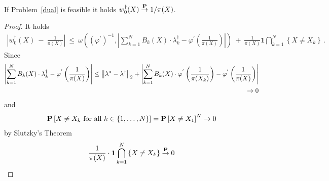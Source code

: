 \begin{theorem}
  If Problem~\ref{dual} is feasible it holds
  $w_0^\dagger(X)\overset{\P}{\to}1/\pi(X)$.
\end{theorem}
\begin{proof}
  It holds
  \begin{align*}
    \left| 
    w_0^\dagger(X)
    \ 
    -
    \ 
    \frac{1}{\pi(X)}
    \right|
    \
    \le
    \
    \omega
    \left( 
      (\varphi^{'})^{-1}
      ,
      \left| 
      \sum_{k=1}^{N} 
      B_k(X)\cdot\lambda_k^\dagger-
      \varphi^{'}
      \left( \frac{1}{\pi(X)} \right)
      \right|
    \right)
    \
    +
    \
    \frac{1}{\pi(X)}
    \mathbf{1}
    \bigcap_{k=1}^N
    \left\{ X\neq X_k \right\}
    \,.
  \end{align*}
  Since
  \begin{align*}
      \left| 
      \sum_{k=1}^{N} 
      B_k(X)\cdot\lambda_k^\dagger-
      \varphi^{'}
      \left( \frac{1}{\pi(X)} \right)
      \right|
      \le
      \norm{\lambda^*-\lambda^\dagger}_2
      +
      \left| 
      \sum_{k=1}^{N} 
      B_k(X)\cdot
      \varphi^{'}
      \left( \frac{1}{\pi(X_k)} \right)
      -
      \varphi^{'}
      \left( \frac{1}{\pi(X)} \right)
      \right|
      \\
      \to 0
  \end{align*}
  and
  \begin{align*}
    \P
    \left[ 
      X\neq X_k \ \text{for all }
      k\in \left\{ 1,\ldots,N \right\}
    \right]
    =
    \P \left[ X\neq X_1 \right]^N
    \to
    0
  \end{align*}
  by Slutzky's Theorem
  \begin{align*}
    \frac{1}{\pi(X)}
    \cdot
    \mathbf{1}
    \bigcap_{k=1}^N
    \left\{ X\neq X_k \right\}
    \overset{\P}{\to}0
  \end{align*}
\end{proof}
